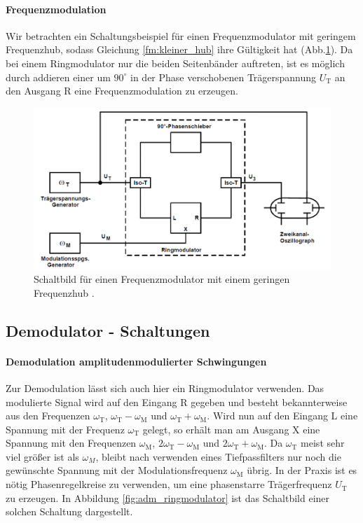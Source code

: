 \paragraph{Frequenzmodulation}
Wir betrachten ein Schaltungsbeispiel für einen Frequenzmodulator mit geringem Frequenzhub, sodass Gleichung \eqref{fm:kleiner_hub} ihre Gültigkeit hat (Abb.\ref{fig:fm-erzeugung}).
Da bei einem Ringmodulator nur die beiden Seitenbänder auftreten, ist es möglich durch addieren einer um $90^\circ$ in der Phase verschobenen Trägerspannung $U_\text{T}$ an den Ausgang R eine Frequenzmodulation zu erzeugen.

\begin{figure}[!h]
    \centering
    \includegraphics[width = 14cm]{images/fm_schaltbild.png}
    \caption{Schaltbild für einen Frequenzmodulator mit einem geringen Frequenzhub \cite{V59}.}
    \label{fig:fm-erzeugung}
\end{figure}

\subsection{Demodulator - Schaltungen}
\label{subsec:debye}

\paragraph{Demodulation amplitudenmodulierter Schwingungen}
Zur Demodulation lässt sich auch hier ein Ringmodulator verwenden.
Das modulierte Signal wird auf den Eingang R gegeben und besteht bekannterweise aus den Frequenzen $\omega_\text{T}$, $\omega_\text{T} - \omega_\text{M}$ und $\omega_\text{T} + \omega_\text{M}$.
Wird nun auf den Eingang L eine Spannung mit der Frequenz $\omega_\text{T}$ gelegt, so erhält man am Ausgang X eine Spannung mit den Frequenzen $\omega_\text{M}$, $2\omega_\text{T} - \omega_\text{M}$ und $2\omega_\text{T} + \omega_\text{M}$.
Da $\omega_\text{T}$ meist sehr viel größer ist als $\omega_{M}$, bleibt nach verwenden eines Tiefpassfilters nur noch die gewünschte Spannung mit der Modulationsfrequenz $\omega_\text{M}$ übrig.
In der Praxis ist es nötig Phasenregelkreise zu verwenden, um eine phasenstarre Trägerfrequenz $U_\text{T}$ zu erzeugen.
In Abbildung \ref{fig:adm_ringmodulator} ist das Schaltbild einer solchen Schaltung dargestellt.

